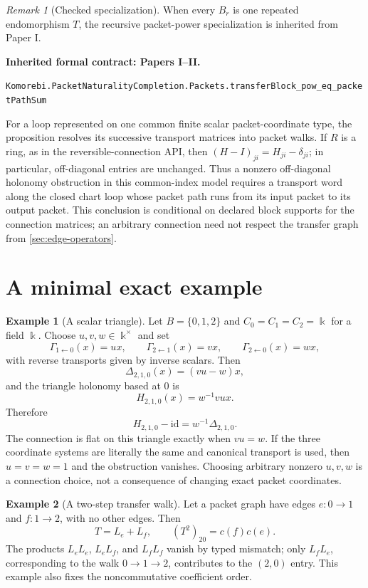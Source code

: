\documentclass[11pt,a4paper]{article}
\theoremstyle{plain}
\theoremstyle{definition}
\newtheorem{example}[example]{Example}
\theoremstyle{remark}
\newtheorem{remark}[remark]{Remark}
\newcommand{\bbk}{\Bbbk}
\newcommand{\id}{\mathrm{id}}
\newcommand{\leanname}[1]{\nolinkurl{#1}}
\newcommand{\statusleanprior}[1]{\par\smallskip\noindent\begin{minipage}{\linewidth}{\color{leanblue}\textbf{Inherited formal contract: Papers I--II.}}\par\begingroup\small\raggedright\leanname{#1}\par\endgroup\end{minipage}\par\smallskip}
\begin{document}
\begin{remark}[Checked specialization]
When every $B_r$ is one repeated endomorphism $T$, the recursive packet-power
specialization is inherited from Paper I.
\end{remark}
\statusleanprior{Komorebi.PacketNaturalityCompletion.Packets.transferBlock_pow_eq_packetPathSum}

For a loop represented on one common finite scalar packet-coordinate type,
the proposition resolves its successive transport matrices into packet
walks.  If $R$ is a ring, as in the reversible-connection API, then
$(H-I)_{ji}=H_{ji}-\delta_{ji}$; in particular, off-diagonal entries are
unchanged.  Thus a nonzero off-diagonal holonomy obstruction in this
common-index model requires a transport word along the closed chart loop
whose packet path runs from its input packet to its output packet.  This
conclusion is conditional on declared block supports for the connection
matrices; an arbitrary connection need not respect the transfer graph from
\cref{sec:edge-operators}.

\section{A minimal exact example}
\label{sec:example}

\begin{example}[A scalar triangle]
Let $B=\{0,1,2\}$ and $C_0=C_1=C_2=\bbk$ for a field $\bbk$.  Choose
$u,v,w\in\bbk^\times$ and set
\[
\Gamma_{1\leftarrow0}(x)=ux,\qquad
\Gamma_{2\leftarrow1}(x)=vx,\qquad
\Gamma_{2\leftarrow0}(x)=wx,
\]
with reverse transports given by inverse scalars.  Then
\[
\Delta_{2,1,0}(x)=(vu-w)x,
\]
and the triangle holonomy based at $0$ is
\[
H_{2,1,0}(x)=w^{-1}vux.
\]
Therefore
\[
H_{2,1,0}-\id
=w^{-1}\Delta_{2,1,0}.
\]
The connection is flat on this triangle exactly when $vu=w$.  If the three
coordinate systems are literally the same and canonical transport is used,
then $u=v=w=1$ and the obstruction vanishes.  Choosing arbitrary nonzero
$u,v,w$ is a connection choice, not a consequence of changing exact packet
coordinates.
\end{example}

\begin{example}[A two-step transfer walk]
Let a packet graph have edges $e:0\to1$ and $f:1\to2$, with no other edges.
Then
\[
T=L_e+L_f,\qquad
(T^2)_{20}=c(f)c(e).
\]
The products $L_eL_e$, $L_eL_f$, and $L_fL_f$ vanish by typed mismatch;
only $L_fL_e$, corresponding to the walk $0\to1\to2$, contributes to the
$(2,0)$ entry.  This example also fixes the noncommutative coefficient order.
\end{example}
\end{document}
